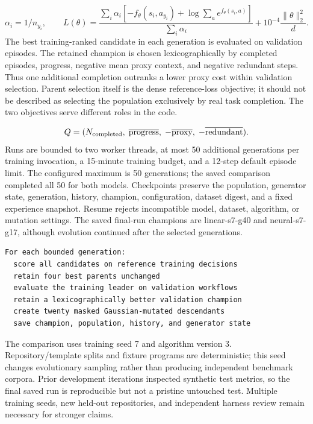 \documentclass[11pt]{article}
\begin{document}
\[
\alpha_i=1/n_{y_i},\qquad L(\theta)=\frac{\sum_i\alpha_i[-f_\theta(s_i,a_{y_i})+\log\sum_a e^{f_\theta(s_i,a)}]}{\sum_i\alpha_i}+10^{-4}\frac{\|\theta\|_2^2}{d}.
\]
The best training-ranked candidate in each generation is evaluated on validation episodes. The retained champion is chosen lexicographically by completed episodes, progress, negative mean proxy context, and negative redundant steps. Thus one additional completion outranks a lower proxy cost within validation selection. Parent selection itself is the dense reference-loss objective; it should not be described as selecting the population exclusively by real task completion. The two objectives serve different roles in the code.

\[
Q=(N_{\rm completed},\;\overline{\mathrm{progress}},\;-\overline{\mathrm{proxy}},\;-\overline{\mathrm{redundant}}).
\]
Runs are bounded to two worker threads, at most 50 additional generations per training invocation, a 15-minute training budget, and a 12-step default episode limit. The configured maximum is 50 generations; the saved comparison completed all 50 for both models. Checkpoints preserve the population, generator state, generation, history, champion, configuration, dataset digest, and a fixed experience snapshot. Resume rejects incompatible model, dataset, algorithm, or mutation settings. The saved final-run champions are linear-s7-g40 and neural-s7-g17, although evolution continued after the selected generations.

\begin{verbatim}
For each bounded generation:
  score all candidates on reference training decisions
  retain four best parents unchanged
  evaluate the training leader on validation workflows
  retain a lexicographically better validation champion
  create twenty masked Gaussian-mutated descendants
  save champion, population, history, and generator state
\end{verbatim}
The comparison uses training seed 7 and algorithm version 3. Repository/template splits and fixture programs are deterministic; this seed changes evolutionary sampling rather than producing independent benchmark corpora. Prior development iterations inspected synthetic test metrics, so the final saved run is reproducible but not a pristine untouched test. Multiple training seeds, new held-out repositories, and independent harness review remain necessary for stronger claims.
\end{document}
